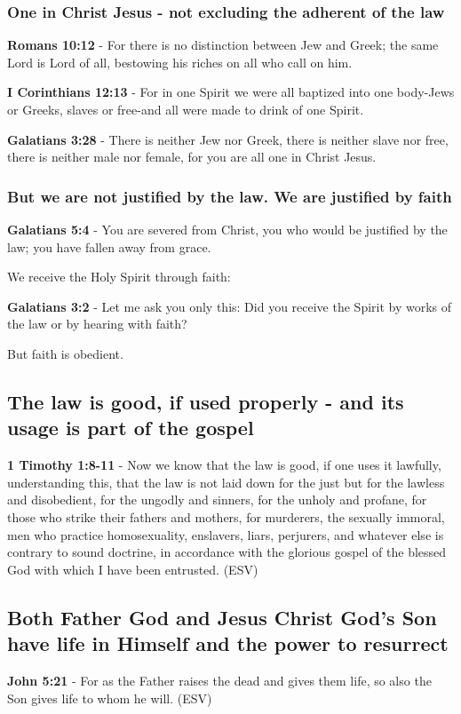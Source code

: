 \documentclass[11pt]{article}
\begin{document}
\subsubsection{One in Christ Jesus - not excluding the adherent of the law}
\label{sec:orgad5945c}

\textbf{Romans 10:12} - For there is no distinction between Jew and Greek; the same Lord is Lord of all, bestowing his riches on all who call on him.

\textbf{I Corinthians 12:13} - For in one Spirit we were all baptized into one body-Jews or Greeks, slaves or free-and all were made to drink of one Spirit.

\textbf{Galatians 3:28} - There is neither Jew nor Greek, there is neither slave nor free, there is neither male nor female, for you are all one in Christ Jesus.

\subsubsection{But we are not justified by the law. We are justified by faith}
\label{sec:org2f7d5f1}

\textbf{Galatians 5:4} - You are severed from Christ, you who would be justified by the law; you have fallen away from grace.

We receive the Holy Spirit through faith:

\textbf{Galatians 3:2} - Let me ask you only this: Did you receive the Spirit by works of the law or by hearing with faith?􄌹

But faith is obedient.

\subsection{The law is good, if used properly - and its usage is part of the gospel}
\label{sec:org1a64551}
\textbf{1 Timothy 1:8-11} - Now we know that the law is good, if one uses it lawfully, understanding this, that the law is not laid down for the just but for the lawless and disobedient, for the ungodly and sinners, for the unholy and profane, for those who strike their fathers and mothers, for murderers, the sexually immoral, men who practice homosexuality, enslavers, liars, perjurers, and whatever else is contrary to sound doctrine, in accordance with the glorious gospel of the blessed God with which I have been entrusted. (ESV)

\subsection{Both Father God and Jesus Christ God's Son have life in Himself and the power to resurrect}
\label{sec:org98ea109}
\textbf{John 5:21} - For as the Father raises the dead and gives them life, so also the Son gives life to whom he will. (ESV)
\end{document}
